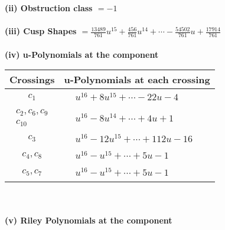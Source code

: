\documentclass[1p]{elsarticle_modified}
\theoremstyle{definition}
\begin{document}
\flushleft \textbf{(ii) Obstruction class $= -1$}\\~\\
\flushleft \textbf{(iii) Cusp Shapes $= \frac{13489}{761} u^{15}+\frac{456}{761} u^{14}+\cdots-\frac{54502}{761} u+\frac{17914}{761}$}\\~\\
\newpage\renewcommand{\arraystretch}{1}
\flushleft \textbf{(iv) u-Polynomials at the component}\newline \\
\begin{tabular}{m{50pt}|m{274pt}}
Crossings & \hspace{64pt}u-Polynomials at each crossing \\
\hline $$\begin{aligned}c_{1}\end{aligned}$$&$\begin{aligned}
&u^{16}+8 u^{15}+\cdots-22 u-4
\end{aligned}$\\
\hline $$\begin{aligned}c_{2},c_{6},c_{9}\\c_{10}\end{aligned}$$&$\begin{aligned}
&u^{16}-8 u^{14}+\cdots+4 u+1
\end{aligned}$\\
\hline $$\begin{aligned}c_{3}\end{aligned}$$&$\begin{aligned}
&u^{16}-12 u^{15}+\cdots+112 u-16
\end{aligned}$\\
\hline $$\begin{aligned}c_{4},c_{8}\end{aligned}$$&$\begin{aligned}
&u^{16}- u^{15}+\cdots+5 u-1
\end{aligned}$\\
\hline $$\begin{aligned}c_{5},c_{7}\end{aligned}$$&$\begin{aligned}
&u^{16}- u^{15}+\cdots+5 u-1
\end{aligned}$\\
\hline
\end{tabular}\\~\\
\newpage\renewcommand{\arraystretch}{1}
\flushleft \textbf{(v) Riley Polynomials at the component}\newline \\
\end{document}
